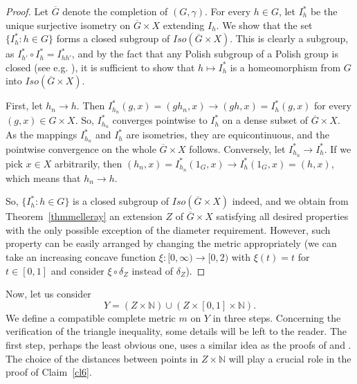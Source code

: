 \documentclass[a4paper]{amsart}
\theoremstyle{plain}
\theoremstyle{remark}
\begin{document}
\begin{proof}
Let $ \overline{G} $ denote the completion of $ (G, \gamma) $. For every $ h \in G $, let $ I_{h}^{*} $ be the unique surjective isometry on $ \overline{G} \times X $ extending $ I_{h} $. We show that the set $ \{ I_{h}^{*} : h \in G \} $ forms a closed subgroup of $ Iso(\overline{G} \times X) $. This is clearly a subgroup, as $ I_{h'}^{*} \circ I_{h}^{*} = I_{hh'}^{*} $, and by the fact that any Polish subgroup of a Polish group is closed (see e.g. \cite[Exercise~9.6]{kechris}), it is sufficient to show that $ h \mapsto I_{h}^{*} $ is a homeomorphism from $ G $ into $ Iso(\overline{G} \times X) $.

First, let $ h_{n} \to h $. Then $ I_{h_{n}}^{*}(g, x) = (gh_{n}, x) \to (gh, x) = I_{h}^{*}(g, x) $ for every $ (g, x) \in G \times X $. So, $ I_{h_{n}}^{*} $ converges pointwise to $ I_{h}^{*} $ on a dense subset of $ \overline{G} \times X $. As the mappings $ I_{h_{n}}^{*} $ and $ I_{h}^{*} $ are isometries, they are equicontinuous, and the pointwise convergence on the whole $ \overline{G} \times X $ follows. Conversely, let $ I_{h_{n}}^{*} \to I_{h}^{*} $. If we pick $ x \in X $ arbitrarily, then $ (h_{n}, x) = I_{h_{n}}^{*}(1_{G}, x) \to I_{h}^{*}(1_{G}, x) = (h, x) $, which means that $ h_{n} \to h $.

So, $ \{ I_{h}^{*} : h \in G \} $ is a closed subgroup of $ Iso(\overline{G} \times X) $ indeed, and we obtain from Theorem~\ref{thmmelleray} an extension $ Z $ of $ \overline{G} \times X $ satisfying all desired properties with the only possible exception of the diameter requirement. However, such property can be easily arranged by changing the metric appropriately (we can take an increasing concave function $ \xi : [0, \infty) \to [0, 2) $ with $ \xi(t) = t $ for $ t \in [0, 1] $ and consider $ \xi \circ \delta_{Z} $ instead of $ \delta_{Z} $).
\end{proof}


Now, let us consider
$$ Y = (Z \times \mathbb{N}) \cup (Z \times [0, 1] \times \mathbb{N}). $$
We define a compatible complete metric $ m $ on $ Y $ in three steps. Concerning the verification of the triangle inequality, some details will be left to the reader. The first step, perhaps the least obvious one, uses a similar idea as the proofs of \cite[Theorem~39]{cdk2} and \cite[Theorem~41]{cdk2}. The choice of the distances between points in $ Z \times \mathbb{N} $ will play a crucial role in the proof of Claim~\ref{cl6}.
\end{document}
